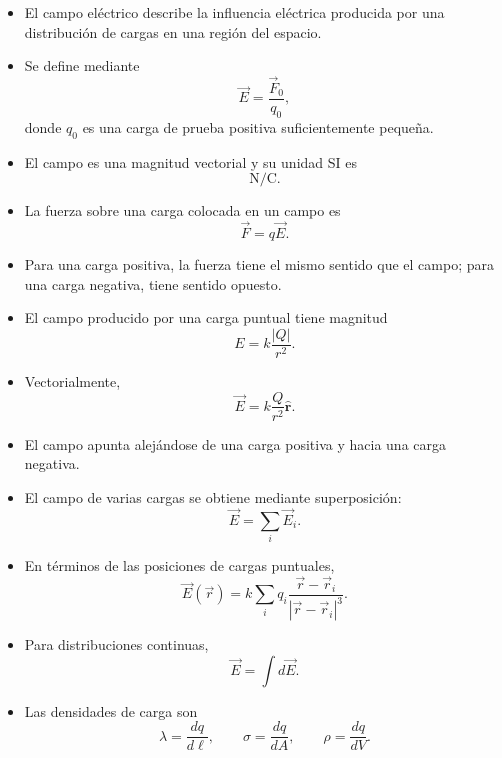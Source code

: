 \begin{resumen}

\begin{itemize}
    \item El campo eléctrico describe la influencia eléctrica producida por una
    distribución de cargas en una región del espacio.

    \item Se define mediante
    \[
    \boxed{\vec E=\frac{\vec F_0}{q_0}},
    \]
    donde \(q_0\) es una carga de prueba positiva suficientemente pequeña.

    \item El campo es una magnitud vectorial y su unidad SI es
    \[
    \boxed{\si{\newton\per\coulomb}}.
    \]

    \item La fuerza sobre una carga colocada en un campo es
    \[
    \boxed{\vec F=q\vec E}.
    \]

    \item Para una carga positiva, la fuerza tiene el mismo sentido que el campo; para
    una carga negativa, tiene sentido opuesto.

    \item El campo producido por una carga puntual tiene magnitud
    \[
    \boxed{E=k\frac{|Q|}{r^2}}.
    \]

    \item Vectorialmente,
    \[
    \boxed{\vec E=k\frac{Q}{r^2}\hat{\mathbf r}}.
    \]

    \item El campo apunta alejándose de una carga positiva y hacia una carga
    negativa.

    \item El campo de varias cargas se obtiene mediante superposición:
    \[
    \boxed{\vec E=\sum_i\vec E_i}.
    \]

    \item En términos de las posiciones de cargas puntuales,
    \[
    \boxed{
    \vec E(\vec r)
    =
    k\sum_i q_i
    \frac{\vec r-\vec r_i}{|\vec r-\vec r_i|^3}
    }.
    \]

    \item Para distribuciones continuas,
    \[
    \boxed{\vec E=\int d\vec E}.
    \]

    \item Las densidades de carga son
    \[
    \boxed{\lambda=\frac{dq}{d\ell}},
    \qquad
    \boxed{\sigma=\frac{dq}{dA}},
    \qquad
    \boxed{\rho=\frac{dq}{dV}}.
    \]


\end{itemize}
\end{resumen}
